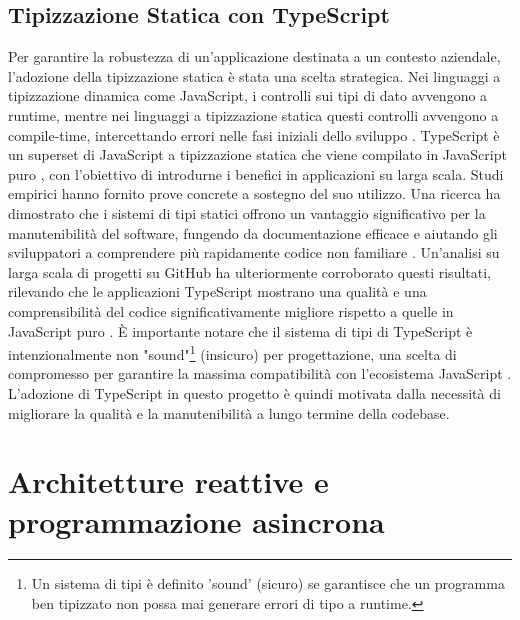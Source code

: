\documentclass[12pt,a4paper,openright,twoside]{book}
\begin{document}
\subsection{Tipizzazione Statica con TypeScript}
Per garantire la robustezza di un'applicazione destinata a un contesto aziendale, l'adozione della tipizzazione statica è stata una scelta strategica.
Nei linguaggi a tipizzazione dinamica come JavaScript, i controlli sui tipi di dato avvengono a runtime, mentre nei linguaggi a tipizzazione statica questi controlli avvengono a compile-time, intercettando errori nelle fasi iniziali dello sviluppo \cite{mayerTyping}. TypeScript è un superset di JavaScript a tipizzazione statica che viene compilato in JavaScript puro \cite{bierman2014understanding}, con l'obiettivo di introdurne i benefici in applicazioni su larga scala. Studi empirici hanno fornito prove concrete a sostegno del suo utilizzo. Una ricerca ha dimostrato che i sistemi di tipi statici offrono un vantaggio significativo per la manutenibilità del software, fungendo da documentazione efficace e aiutando gli sviluppatori a comprendere più rapidamente codice non familiare \cite{hanenberg2014empirical}. Un'analisi su larga scala di progetti su GitHub ha ulteriormente corroborato questi risultati, rilevando che le applicazioni TypeScript mostrano una qualità e una comprensibilità del codice significativamente migliore rispetto a quelle in JavaScript puro \cite{Bogner_2022}. È importante notare che il sistema di tipi di TypeScript è intenzionalmente non "sound"\footnote{Un sistema di tipi è definito 'sound' (sicuro) se garantisce che un programma ben tipizzato non possa mai generare errori di tipo a runtime.} (insicuro) per progettazione, una scelta di compromesso per garantire la massima compatibilità con l'ecosistema JavaScript \cite{bierman2014understanding}. L'adozione di TypeScript in questo progetto è quindi motivata dalla necessità di migliorare la qualità e la manutenibilità a lungo termine della codebase.

\section{Architetture reattive e programmazione asincrona}
\end{document}

